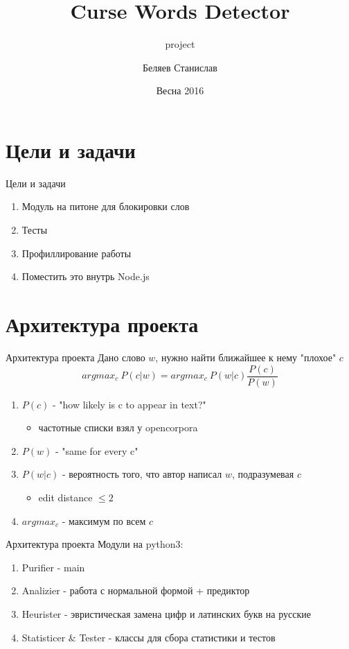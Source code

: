 \documentclass{beamer}
\title{Curse Words Detector}
\subtitle{project}
\author{Беляев Станислав}
\institute{СПб АУ РАН}
\date{Весна 2016}
\begin{document}
\frame{\titlepage}

\section{Цели и задачи}
\begin{frame}[<+->]{Цели и задачи}
    \begin{enumerate}
        \item Модуль на питоне для блокировки слов
        \item Тесты
        \item Профиллирование работы
        \item Поместить это внутрь Node.js
    \end{enumerate}
\end{frame}

\section{Архитектура проекта}
\begin{frame}[t]{Архитектура проекта}
    Дано слово $w$, нужно найти ближайшее к нему "плохое" $c$
    $$argmax_c ~ {P(c|w)} = argmax_c ~ {P(w|c) \frac{P(c)}{P(w)}}$$
    \begin{enumerate}
        \item $P(c)$ - "how likely is c to appear in text?"
            \begin{itemize}
                \item частотные списки взял у opencorpora
            \end{itemize}
        \item $P(w)$ - "same for every c"
        \item $P(w|c)$ - вероятность того, что автор написал $w$, подразумевая $c$
            \begin{itemize}
                \item edit distance $\leqslant 2$
            \end{itemize}
        \item $argmax_c$ - максимум по всем $c$
    \end{enumerate}
\end{frame}
\begin{frame}[t]{Архитектура проекта}
    Модули на python3:
    \begin{enumerate}
        \item Purifier - main
        \item Analizier - работа с нормальной формой + предиктор
        \item Heurister - эвристическая замена цифр и латинских букв на русские
        \item Statisticer $\&$ Tester - классы для сбора статистики и тестов
    \end{enumerate}
\end{frame}
\end{document}
